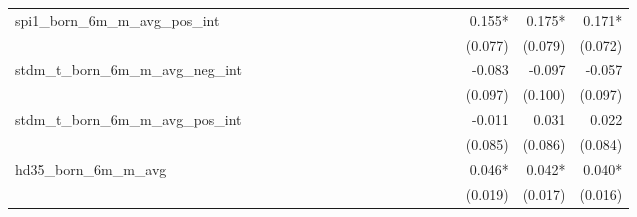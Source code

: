 \begin{tabular}{lrrrrrrrrrrrrrrrrrr}
spi1\_born\_6m\_m\_avg\_pos\_int            &             &             &             &             &             &             &             &             &             &             &             &             &             &             &             &      0.155* &      0.175* &      0.171* \\ 
                                            &             &             &             &             &             &             &             &             &             &             &             &             &             &             &             &     (0.077) &     (0.079) &     (0.072) \\ 
stdm\_t\_born\_6m\_m\_avg\_neg\_int         &             &             &             &             &             &             &             &             &             &             &             &             &             &             &             &      -0.083 &      -0.097 &      -0.057 \\ 
                                            &             &             &             &             &             &             &             &             &             &             &             &             &             &             &             &     (0.097) &     (0.100) &     (0.097) \\ 
stdm\_t\_born\_6m\_m\_avg\_pos\_int         &             &             &             &             &             &             &             &             &             &             &             &             &             &             &             &      -0.011 &       0.031 &       0.022 \\ 
                                            &             &             &             &             &             &             &             &             &             &             &             &             &             &             &             &     (0.085) &     (0.086) &     (0.084) \\ 
hd35\_born\_6m\_m\_avg                      &             &             &             &             &             &             &             &             &             &             &             &             &             &             &             &      0.046* &      0.042* &      0.040* \\ 
                                            &             &             &             &             &             &             &             &             &             &             &             &             &             &             &             &     (0.019) &     (0.017) &     (0.016) \\ 

\end{tabular}
